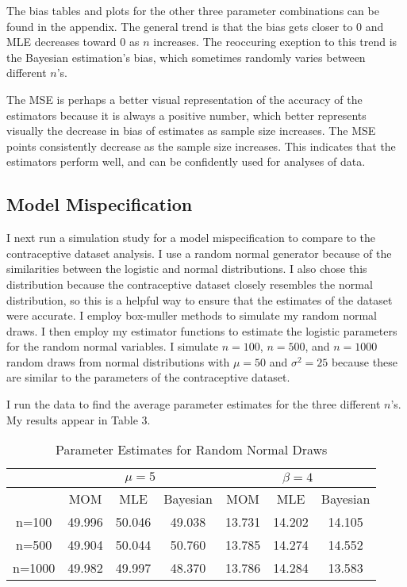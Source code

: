 \documentclass{svproc}
\begin{document}
The bias tables and plots for the other three parameter combinations can be found in the appendix. The general trend is that the bias gets closer to $0$ and MLE decreases toward $0$ as $n$ increases. The reoccuring exeption to this trend is the Bayesian estimation's bias, which sometimes randomly varies between different $n$'s. 

The MSE is perhaps a better visual representation of the accuracy of the estimators because it is always a positive number, which better represents visually the decrease in bias of estimates as sample size increases. The MSE points consistently decrease as the sample size increases. This indicates that the estimators perform well, and can be confidently used for analyses of data.  

\subsection{Model Mispecification}

I next run a simulation study for a model mispecification to compare to the contraceptive dataset analysis. I use a random normal generator because of the similarities between the logistic and normal distributions. I also chose this distribution because the contraceptive dataset closely resembles the normal distribution, so this is a helpful way to ensure that the estimates of the dataset were accurate. I employ box-muller methods to simulate my random normal draws. I then employ my estimator functions to estimate the logistic parameters for the random normal variables. I simulate $n=100$, $n=500$, and $n=1000$ random draws from normal distributions with $\mu=50$ and $\sigma^2=25$ because these are similar to the parameters of the contraceptive dataset. 

I run the data to find the average parameter estimates for the three different $n$'s. My results appear in Table 3.

\begin{table}[H]
\begin{center}
\begin{tabular}{|c|c|c|c|c|c|c|}
\hline
  &\multicolumn{3}{|c|}{$\mu=5$}& \multicolumn{3}{|c|}{$\beta=4$} \\
\hline
 & MOM & MLE & Bayesian & MOM & MLE & Bayesian \\
\hline
n=100 & 49.996 & 50.046 & 49.038 & 13.731 & 14.202 & 14.105 \\
\hline
n=500 & 49.904 & 50.044 & 50.760 & 13.785 & 14.274 & 14.552 \\
\hline
n=1000 & 49.982 & 49.997 & 48.370 & 13.786 & 14.284 & 13.583  \\
\hline
\end{tabular}
\medskip
\caption{Parameter Estimates for Random Normal Draws}
\label{tab3}
\end{center}
\end{table}
\end{document}
